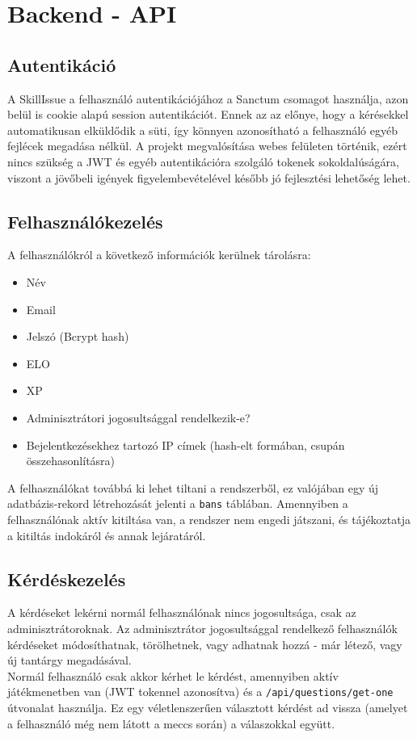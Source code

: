 \chapter{Backend - API}

\section{Autentikáció}
A SkillIssue a felhasználó autentikációjához a Sanctum csomagot használja, azon belül is cookie alapú session autentikációt. Ennek az az előnye, hogy a kérésekkel automatikusan elküldődik a süti, így könnyen azonosítható a felhasználó egyéb fejlécek megadása nélkül. A projekt megvalósítása webes felületen történik, ezért nincs szükség a JWT és egyéb autentikációra szolgáló tokenek sokoldalúságára, viszont a jövőbeli igények figyelembevételével később jó fejlesztési lehetőség lehet.

\section{Felhasználókezelés}
A felhasználókról a következő információk kerülnek tárolásra:
\begin{itemize}
    \item Név
    \item Email
    \item Jelszó (Bcrypt hash)
    \item ELO
    \item XP
    \item Adminisztrátori jogosultsággal rendelkezik-e?
    \item Bejelentkezésekhez tartozó IP címek (hash-elt formában, csupán összehasonlításra)\footnotemark
\end{itemize}

A felhasználókat továbbá ki lehet tiltani a rendszerből, ez valójában egy új adatbázis-rekord létrehozását jelenti a \texttt{bans} táblában. Amennyiben a felhasználónak aktív kitiltása van, a rendszer nem engedi játszani, és tájékoztatja a kitiltás indokáról és annak lejáratáról.



\section{Kérdéskezelés}
A kérdéseket lekérni normál felhasználónak nincs jogosultsága, csak az adminisztrátoroknak. Az adminisztrátor jogosultsággal rendelkező felhasználók kérdéseket módosíthatnak, törölhetnek, vagy adhatnak hozzá - már létező, vagy új tantárgy megadásával. 
\\
Normál felhasználó csak akkor kérhet le kérdést, amennyiben aktív játékmenetben van (JWT tokennel azonosítva) és a \texttt{/api/questions/get-one} útvonalat használja. Ez egy véletlenszerűen választott kérdést ad vissza (amelyet a felhasználó még nem látott a meccs során) a válaszokkal együtt.

